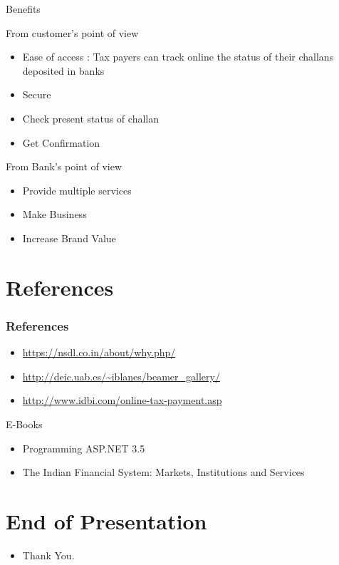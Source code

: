 \documentclass{ctexbeamer}
\begin{document}
  \begin{frame}{Benefits}
  
  \begin{block}{From customer’s point of view}
  \end{block}
  \begin{itemize}
  
  \item Ease of access : Tax payers can track online the status of their challans deposited in banks
  \item Secure
    \item Check present status of challan
    \item Get Confirmation
  
  \end{itemize}
  
  \begin{block}{From Bank’s point of view}
  \end{block}
  \begin{itemize}
  
  \item Provide multiple services
  \item Make Business
  \item Increase Brand Value
  \end{itemize}
  
  \vskip 1cm
  \end{frame}
  
  \section{References}
  \begin{frame}
  \frametitle{References}
  \begin{itemize}
  \item \url{https://nsdl.co.in/about/why.php/}
  \item \url{http://deic.uab.es/~iblanes/beamer_gallery/} \\
  \item \url{http://www.idbi.com/online-tax-payment.asp} \\
  \end{itemize}
  
  
  \begin{block}{E-Books}
  \begin{itemize}
  
  \item Programming ASP.NET 3.5 
  \item The Indian Financial System: Markets, Institutions and Services
  \end{itemize}
  \end{block}
  \vskip 1cm
  \end{frame}
  
  
  \section{End of Presentation}
  \begin{frame}
  \begin{itemize}[<+-| alert@+>]
  \item Thank You.
  \end{itemize}
  \end{frame}
  
  
\end{document}
